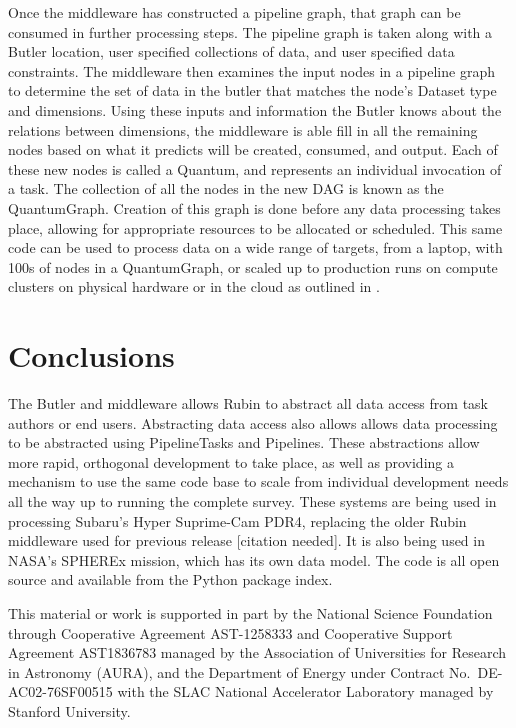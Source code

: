 \documentclass[11pt,twoside]{article}
\begin{document}
Once the middleware has constructed a pipeline graph, that graph can be consumed in further processing steps. The pipeline graph is taken along with a Butler location, user specified collections of data, and user specified data constraints.  The middleware then examines the input nodes in a pipeline graph to determine the set of data in the butler that matches the node's Dataset type and dimensions. Using these inputs and information the Butler knows about the relations between dimensions, the middleware is able fill in all the remaining nodes based on what it predicts will be created, consumed, and output. Each of these new nodes is called a Quantum, and represents an individual invocation of a task. The collection of all the nodes in the new DAG is known as the QuantumGraph. Creation of this graph is done before any data processing takes place, allowing for appropriate resources to be allocated or scheduled. This same code can be used to process data on a wide range of targets, from a laptop, with 100s of nodes in a QuantumGraph, or scaled up to production runs on compute clusters on physical hardware or in the cloud as outlined in \citet{P52_adassxxxii}.

\section{Conclusions}
The Butler and middleware allows Rubin to abstract all data access from task authors or end users. Abstracting data access also allows allows data processing to be abstracted using PipelineTasks and Pipelines. These abstractions allow more rapid, orthogonal development to take place, as well as providing a mechanism to use the same code base to scale from individual development needs all the way up to running the complete survey. These systems are being used in processing Subaru's Hyper Suprime-Cam PDR4, replacing the older Rubin middleware used for previous release [citation needed]. It is also being used in NASA's SPHEREx mission, which has its own data model. The code is all open source and available from the Python package index.

\acknowledgments This material or work is supported in part by the National Science Foundation through Cooperative Agreement AST-1258333 and Cooperative Support Agreement AST1836783 managed by the Association of Universities for Research in Astronomy (AURA), and the Department of Energy under Contract No.\ DE-AC02-76SF00515 with the SLAC National Accelerator Laboratory managed by Stanford University.


\end{document}
